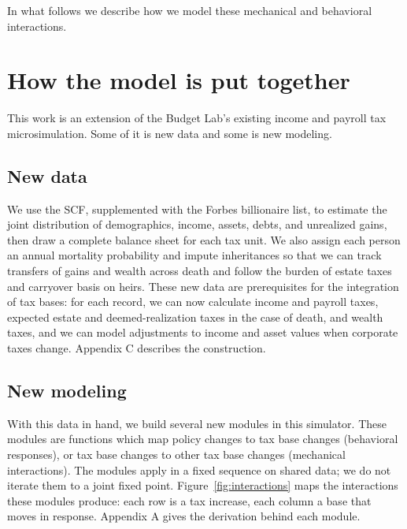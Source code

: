 \documentclass[10pt,twocolumn]{article}
\begin{document}
In what follows we describe how we model these mechanical and behavioral
interactions.

\section{How the model is put together}

This work is an extension of the Budget Lab's existing income and payroll tax
microsimulation. Some of it is new data and some is new modeling.

\subsection*{New data}

We use the SCF, supplemented with the Forbes billionaire list, to estimate
the joint distribution of demographics, income, assets, debts, and unrealized
gains, then draw a complete balance sheet for each tax unit. We also assign
each person an annual mortality probability and impute inheritances so that we
can track transfers of gains and wealth across death and follow the burden of
estate taxes and carryover basis on heirs. These new data are prerequisites
for the integration of tax bases: for each record, we can now calculate income
and payroll taxes, expected estate and deemed-realization taxes in the case of
death, and wealth taxes, and we can model adjustments to income and asset
values when corporate taxes change. Appendix C describes the construction.

\subsection*{New modeling}

With this data in hand, we build several new modules in this simulator. These
modules are functions which map policy changes to tax base changes (behavioral
responses), or tax base changes to other tax base changes (mechanical
interactions). The modules apply in a fixed sequence on shared data; we do
not iterate them to a joint fixed point. Figure~\ref{fig:interactions} maps the interactions these
modules produce: each row is a tax increase, each column a base that moves in
response. Appendix A gives the derivation behind each module.
\end{document}
